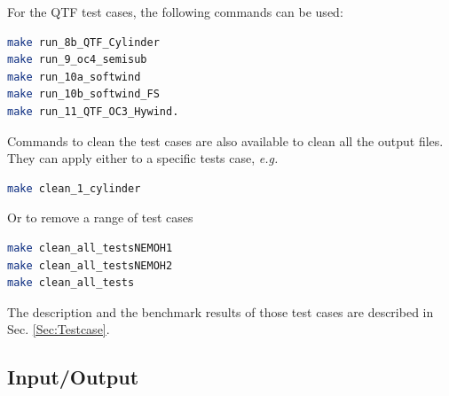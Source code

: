 \documentclass[12pt,a4paper,titlepage]{article}
\begin{document}
For the QTF test cases, the following commands can be used:
\begin{lstlisting}[language=bash,keywordstyle=\color{blue},basicstyle=\ttfamily\footnotesize,backgroundcolor=\color{lightgray}]
make run_8b_QTF_Cylinder
make run_9_oc4_semisub
make run_10a_softwind
make run_10b_softwind_FS
make run_11_QTF_OC3_Hywind.
\end{lstlisting}

Commands to clean the test cases are also available to clean all the output files. They can apply either to a specific tests case, \emph{e.g.}
\begin{lstlisting}[language=bash,keywordstyle=\color{blue},basicstyle=\ttfamily\footnotesize,backgroundcolor=\color{lightgray}]
make clean_1_cylinder
\end{lstlisting}

Or to remove a range of test cases
\begin{lstlisting}[language=bash,keywordstyle=\color{blue},basicstyle=\ttfamily\footnotesize,backgroundcolor=\color{lightgray}]
make clean_all_testsNEMOH1
make clean_all_testsNEMOH2
make clean_all_tests
\end{lstlisting}

The description and the benchmark results of those test cases are described in Sec. \ref{Sec:Testcase}.

\subsection{Input/Output}
\end{document}
